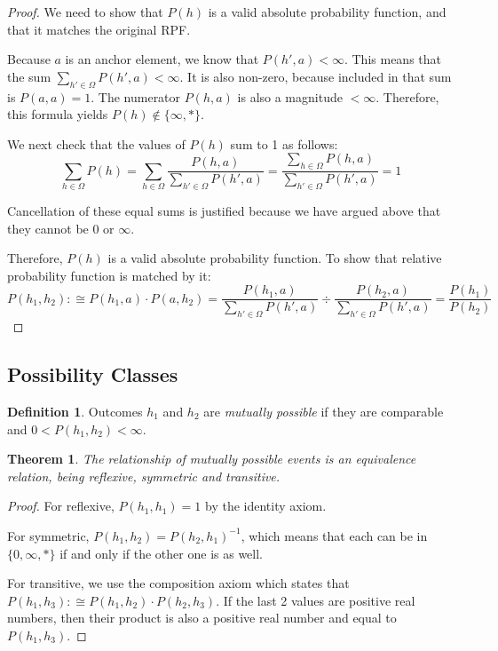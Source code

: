 \documentclass[twoside]{article}
\theoremstyle{plain}%
\newtheorem{theorem}{Theorem}[section]
\theoremstyle{definition}
\newtheorem{definition}{Definition}[section]
\theoremstyle{remark}
\begin{document}
\begin{proof}
We need to show that \(P(h)\) is a valid absolute probability function, and that it matches the original RPF.

Because \(a\) is an anchor element, we know that \(P(h', a) < \infty\). This means that the sum \(\sum_{h' \in \Omega}P(h', a) < \infty\). It is also non-zero, because included in that sum is \(P(a, a) = 1\). The numerator \(P(h, a)\) is also a magnitude \(< \infty\). Therefore, this formula yields \(P(h) \notin \{\infty, \ast\}\).

We next check that the values of \(P(h)\) sum to 1 as follows:
\[\sum_{h \in \Omega}P(h) = \sum_{h \in \Omega} \frac{P(h, a)}{\sum_{h' \in \Omega}P(h', a)} = \frac{\sum_{h \in \Omega}P(h, a)}{\sum_{h' \in \Omega}P(h', a)} = 1\]

Cancellation of these equal sums is justified because we have argued above that they cannot be \(0\) or \(\infty\).

Therefore, \(P(h)\) is a valid absolute probability function. To show that relative probability function is matched by it:
\begin{equation}
P(h_1, h_2) :\cong P(h_1, a) \cdot P(a, h_2) = \frac{P(h_1, a)}{\sum_{h' \in \Omega}P(h', a)} \div \frac{P(h_2, a)}{\sum_{h' \in \Omega}P(h', a)} = \frac{P(h_1)}{P(h_2)}
\end{equation}
\end{proof}

\subsection{Possibility Classes}

\begin{definition}
Outcomes \(h_1\) and \(h_2\) are \textit{mutually possible} if they are comparable and \(0 < P(h_1, h_2) < \infty\).
\end{definition}

\begin{theorem}
The relationship of mutually possible events is an \textit{equivalence relation}, being reflexive, symmetric and transitive.
\end{theorem}

\begin{proof}
For reflexive, \(P(h_1, h_1) = 1\) by the identity axiom.

For symmetric, \(P(h_1, h_2) = P(h_2, h_1)^{-1}\), which means that each can be in \(\{0, \infty, \ast\}\) if and only if the other one is as well.

For transitive, we use the composition axiom which states that \(P(h_1, h_3) :\cong P(h_1, h_2) \cdot P(h_2, h_3)\). If the last 2 values are positive real numbers, then their product is also a positive real number and equal to \(P(h_1, h_3)\).
\end{proof}
\end{document}
